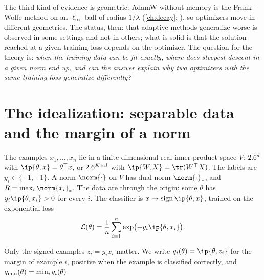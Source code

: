 \begin{refsection}
The third kind of evidence is geometric: AdamW without memory is the Frank--Wolfe method on an $\ell_\infty$ ball of radius $1/\lambda$ (\cref{ch:decay}; \textcite{XieLi2024}), so optimizers move in different geometries. The status, then: that adaptive methods generalize worse is observed in some settings and not in others; what is solid is that the solution reached at a given training loss depends on the optimizer. The question for the theory is: \emph{when the training data can be fit exactly, where does steepest descent in a given norm end up, and can the answer explain why two optimizers with the same training loss generalize differently?}

\section{The idealization: separable data and the margin of a norm}\label{sec:bias:ideal}

\begin{assumption}\label{ass:bias:separable}
The examples $x_1,\dots,x_n$ lie in a finite-dimensional real inner-product space $V$: $2.6^d$ with $\ip{\theta,x}=\theta^\top x$, or $2.6^{K\times d}$ with $\ip{W,X}=\tr(W^\top X)$. The labels are $y_i\in\{-1,+1\}$. A norm $\norm{\cdot}$ on $V$ has dual norm $\norm{\cdot}_*$, and $R=\max_i\norm{x_i}_*$. The data are  through the origin: some $\theta$ has $y_i\ip{\theta,x_i}>0$ for every $i$. The classifier is $x\mapsto\sign\ip{\theta,x}$, trained on the exponential loss
\begin{equation}\label{eq:bias:loss}
  \Loss(\theta)=\frac1n\sum_{i=1}^n\exp\bigl(-y_i\ip{\theta,x_i}\bigr).
\end{equation}
\end{assumption}

Only the signed examples $z_i=y_ix_i$ matter. We write $q_i(\theta)=\ip{\theta,z_i}$ for the margin of example $i$, positive when the example is classified correctly, and $q_{\min}(\theta)=\min_iq_i(\theta)$.



\end{refsection}
